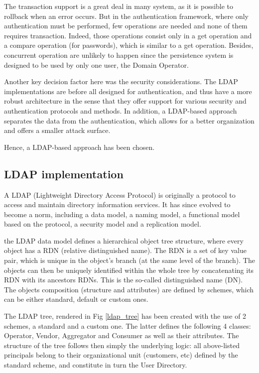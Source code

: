 The transaction support is a great deal in many system, as it is possible to rollback when an error occurs. But in the authentication framework, where only authentication must be performed, few operations are needed and none of them requires transaction. Indeed, those operations consist only in a get operation and a compare operation (for passwords), which is similar to a get operation. Besides, concurrent operation are unlikely to happen since the persistence system is designed to be used by only one user, the Domain Operator.

Another key decision factor here was the security considerations. The LDAP implementations are before all designed for authentication, and thus have a more robust architecture in the sense that they offer support for various security and authentication protocols and methods. In addition, a LDAP-based approach separates the data from the authentication, which allows for a better organization and offers a smaller attack surface.

Hence, a LDAP-based approach has been chosen.

\subsection{LDAP implementation}

A LDAP (Lightweight Directory Access Protocol) is originally a protocol to access and maintain directory information services. It has since evolved to become a norm, including a data model, a naming model, a functional model based on the protocol, a security model and a replication model.

the LDAP data model defines a hierarchical object tree structure, where every object has a RDN (relative distinguished name). The RDN is a set of key value pair, which is unique in the  object's branch (at the same level of the branch). The objects can then be uniquely identified within the whole tree by concatenating its RDN with its ancestors RDNs. This is the so-called distinguished name (DN). The objects composition (structure and attributes) are defined by schemes, which can be either standard, default or custom ones.

The LDAP tree, rendered in Fig \ref{ldap_tree} has been created with the use of 2 schemes, a standard and a custom one. The latter defines the following 4 classes: Operator, Vendor, Aggregator and Consumer as well as their attributes. The structure of the tree follows then simply the underlying logic: all above-listed principals belong to their organizational unit (customers, etc) defined by the standard scheme, and constitute in turn the User Directory.


